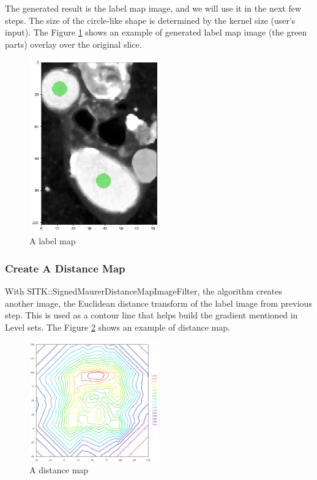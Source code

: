 The generated result is the label map image, and we will use it in the next few steps. The size of the circle-like shape is determined by the kernel size (user's input). The Figure \ref{fig_label_map} shows an example of generated label map image (the green parts) overlay over the original slice.

\begin{figure}[H]
    \centering
    \includegraphics[width=0.5\textwidth]{figures/AGR/label_image.png}
    \caption[A label image]{A label map}
    \label{fig_label_map}
\end{figure}

\subsubsection{Create A Distance Map}\label{distance_map}
With SITK::SignedMaurerDistanceMapImageFilter, the algorithm creates another image, the Euclidean distance transform of the label image from previous step. This is used as a contour line that helps build the gradient mentioned in Level sets. The Figure \ref{fig_distance_map} shows an example of distance map.

\begin{figure}[H]
    \centering
    \includegraphics[width=0.5\textwidth]{figures/AGR/Contour2D.png}
    \caption[A distance map]{A distance map}
    \label{fig_distance_map}
\end{figure}

